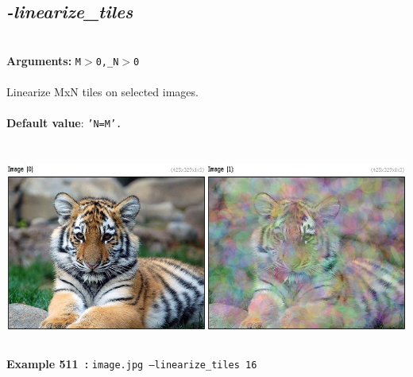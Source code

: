 \documentclass[a4paper,11pt,twoside]{book}
\begin{document}
\subsection{\emph{-linearize\_tiles} }\vspace*{-0.5em}
~\\\textbf{Arguments: } 
{\small \texttt{M$>$0,\_N$>$0}}\\~\\
Linearize MxN tiles on selected images.
~\\~\\\textbf{Default value}: {\small \texttt{'N=M'.}}
\begin{center}\includegraphics[keepaspectratio=true,height=7cm,width=\textwidth]{img/gmic_def511.jpg}\\
{\footnotesize \textbf{Example 511~:} \texttt{image.jpg --linearize\_tiles 16}}
\end{center}
\end{document}
